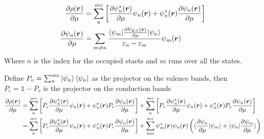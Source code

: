 \begin{frame}[allowframebreaks]
  \begin{align}
    \frac{
      \partial \rho(\boldsymbol{r})
    }{
      \partial \mu
    }
    &=
    \sum_n^{occ}
    \left[
        \frac{
        \partial \psi_n^*(\boldsymbol{r})
        }{
        \partial \mu
        }
        \psi_n(\boldsymbol{r})
        +
        \psi_n^*(\boldsymbol{r})
        \frac{
        \partial \psi_n(\boldsymbol{r})
        }{
        \partial \mu
        }
    \right] \label{eq:density_response_all}\\
    \frac{
      \partial \psi_n(\boldsymbol{r})
    }{
      \partial \mu
    }
    &=
    \sum_{m\ne n}
    \frac{
      \braket{
        \psi_m |
        {\partial V_{KS}(\boldsymbol{r})\over \partial \mu}
        | \psi_n
      }
    }{
        \varepsilon_n - \varepsilon_m
    }
    \psi_m(\boldsymbol{r}) \label{eq:wfc_response}
  \end{align}
  Where $n$ is the index for the occupied staets and $m$ runs over all the states.

  \medskip

  Define $P_v = \sum_n^{occ} \ket{\psi_n}\bra{\psi_n}$ as the projector on the valence
  bands, then $P_c = \mathbb{1} - P_v$ is the projector on the conduction bands
  \begin{align*}
    \frac{
      \partial \rho(\boldsymbol{r})
    }{
      \partial \mu
    }
    &=
    \sum_n^{occ}
    \left[
      P_c
        \frac{
        \partial \psi_n^*(\boldsymbol{r})
        }{
        \partial \mu
        }
        \psi_n(\boldsymbol{r})
        +
        \psi_n^*(\boldsymbol{r})
        P_c
        \frac{
        \partial \psi_n(\boldsymbol{r})
        }{
        \partial \mu
        }
    \right]
    +
    \sum_n^{occ}
    \left[
      P_v
        \frac{
        \partial \psi_n^*(\boldsymbol{r})
        }{
        \partial \mu
        }
        \psi_n(\boldsymbol{r})
        +
        \psi_n^*(\boldsymbol{r})
        P_v
        \frac{
        \partial \psi_n(\boldsymbol{r})
        }{
        \partial \mu
        }
    \right] \\
    &=
    \sum_n^{occ}
    \left[
      P_c
        \frac{
        \partial \psi_n^*(\boldsymbol{r})
        }{
        \partial \mu
        }
        \psi_n(\boldsymbol{r})
        +
        \psi_n^*(\boldsymbol{r})
        P_c
        \frac{
        \partial \psi_n(\boldsymbol{r})
        }{
        \partial \mu
        }
    \right]
    +
    \sum_{mn}^{occ}
      \psi^*_m(\boldsymbol{r})
      \psi_n(\boldsymbol{r})
      \left(
      \braket{
        \frac{
        \partial \psi_n
        }{
        \partial \mu
        }
        |
        \psi_m
      }
      +
      \braket{
        \psi_n
        |
        \frac{
        \partial \psi_m
        }{
        \partial \mu
        }
      }
      \right)
  \end{align*}


\end{frame}

